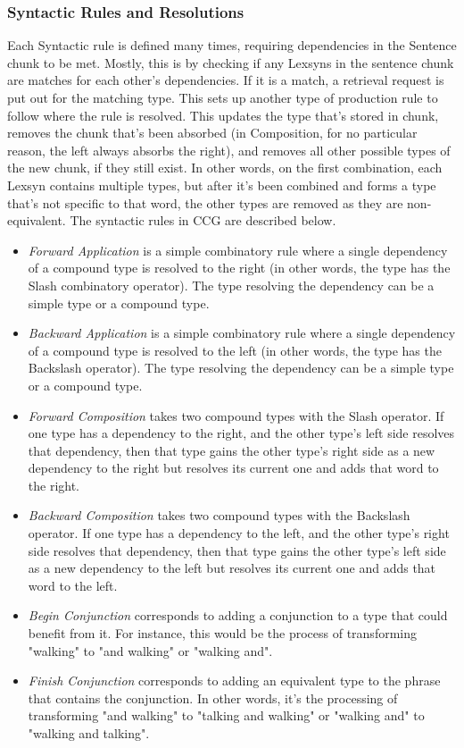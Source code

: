 \subsubsection{Syntactic Rules and Resolutions}
Each Syntactic rule is defined many times, requiring dependencies in the Sentence chunk to be met. Mostly, this is by checking if any Lexsyns in the sentence chunk are matches for each other's dependencies. If it is a match, a retrieval request is put out for the matching type. This sets up another type of production rule to follow where the rule is resolved. This updates the type that's stored in chunk, removes the chunk that's been absorbed (in Composition, for no particular reason, the left always absorbs the right), and removes all other possible types of the new chunk, if they still exist. In other words, on the first combination, each Lexsyn contains multiple types, but after it's been combined and forms a type that's not specific to that word, the other types are removed as they are non-equivalent. The syntactic rules in CCG are described below. 

\begin{itemize}
\item \textit{Forward Application} is a simple combinatory rule where a single dependency of a compound type is resolved to the right (in other words, the type has the Slash combinatory operator). The type resolving the dependency can be a simple type or a compound type. 

\item \textit{Backward Application} is a simple combinatory rule where a single dependency of a compound type is resolved to the left (in other words, the type has the Backslash operator). The type resolving the dependency can be a simple type or a compound type.

\item \textit{Forward Composition} takes two compound types with the Slash operator. If one type has a dependency to the right, and the other type's left side resolves that dependency, then that type gains the other type's right side as a new dependency to the right but resolves its current one and adds that word to the right. 

\item \textit{Backward Composition} takes two compound types with the Backslash operator. If one type has a dependency to the left, and the other type's right side resolves that dependency, then that type gains the other type's left side as a new dependency to the left but resolves its current one and adds that word to the left.  

\item \textit{Begin Conjunction} corresponds to adding a conjunction to a type that could benefit from it. For instance, this would be the process of transforming "walking" to "and walking" or "walking and". 

\item \textit{Finish Conjunction} corresponds to adding an equivalent type to the phrase that contains the conjunction. In other words, it's the processing of transforming "and walking" to "talking and walking" or "walking and" to "walking and talking".
\end{itemize}